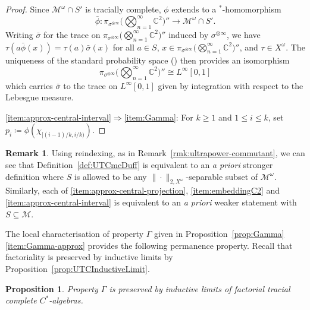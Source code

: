 \documentclass[a4paper,11pt]{amsart}
\newtheorem{proposition}[theorem]{Proposition}
\theoremstyle{definition}
\newtheorem{remark}[theorem]{Remark}
\numberwithin{equation}{section}
\numberwithin{theorem}{section}
\newcommand{\C}{\mathbb C}
\newcommand{\M}{\mathcal{M}}
\begin{document}
\begin{proof}
Since $\M^\omega \cap S'$ is tracially complete, $\phi$ extends to a $^*$-homomorphism
\begin{equation}
  \bar\phi \colon \pi_{\sigma^{\otimes\infty}}\Big(\bigotimes_{n=1}^\infty \mathbb C^2\Big)'' \rightarrow \M^\omega \cap S'.
\end{equation}
Writing $\bar{\sigma}$ for the trace on $\pi_{\sigma^{\otimes\infty}} \Big(\bigotimes_{n=1}^\infty \C^2 \Big)''$ induced by $\sigma^{\otimes\infty}$, we have $\tau(a\bar\phi(x)) = \tau(a) \bar{\sigma}(x)$ for all $a \in S$, $x \in \pi_{\sigma^{\otimes \infty}}\big(\bigotimes_{n=1}^\infty \mathbb C^2\big)''$, and $\tau \in X^\omega$.  The uniqueness of the standard probability space (\cite[Corollary A.11]{Tak79}) then provides an isomorphism 
\begin{equation}
  \pi_{\sigma^{\otimes \infty}}\Big(\bigotimes_{n=1}^\infty \mathbb C^2\Big)'' \cong L^\infty[0, 1]
\end{equation}
which carries $\bar{\sigma}$ to the trace on $L^\infty[0, 1]$ given by integration with respect to the Lebesgue measure.

\ref{item:approx-central-interval}$\Rightarrow$\ref{item:Gamma}: For $k \geq 1$ and $1 \leq i \leq k$, set $p_i \coloneqq  \phi(\chi_{[(i-1)/k, i/k)})$.
\end{proof}

\begin{remark}\label{rmk:gamma-ultrapower-commutant}
Using reindexing, as in Remark~\ref{rmk:ultrapower-commutant}, we can see that Definition~\ref{def:UTCmcDuff} is equivalent to an \emph{a priori} stronger definition where $S$ is allowed to be any $\|\cdot\|_{2, X^\omega}$-separable subset of $\M^\omega$. Similarly, each of \ref{item:approx-central-projection}, \ref{item:embeddingC2} and \ref{item:approx-central-interval} is equivalent to an \emph{a priori} weaker statement with $S \subseteq \M$.
\end{remark}







The local characterisation of property $\Gamma$ given in Proposition~\ref{prop:Gamma}\ref{item:Gamma-approx} provides the following permanence property.  Recall that factoriality is preserved by inductive limits by Proposition~\ref{prop:UTCInductiveLimit}.

\begin{proposition}\label{prop:Gamma-indlim}
Property $\Gamma$ is preserved by inductive limits of factorial tracial complete $C^*$-algebras.
\end{proposition}
\end{document}
